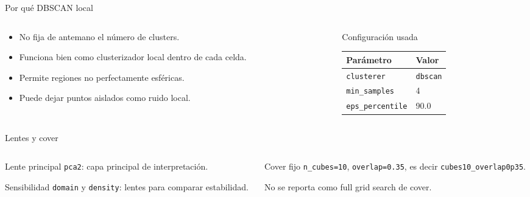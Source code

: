\documentclass[aspectratio=169,10pt]{beamer}
\begin{document}
\begin{frame}{Por qu\'e DBSCAN local}
  \begin{columns}[T,onlytextwidth]
    \begin{column}{0.50\textwidth}
      \begin{itemize}
        \item No fija de antemano el n\'umero de clusters.
        \item Funciona bien como clusterizador local dentro de cada celda.
        \item Permite regiones no perfectamente esf\'ericas.
        \item Puede dejar puntos aislados como ruido local.
      \end{itemize}
    \end{column}
    \begin{column}{0.46\textwidth}
      \begin{block}{Configuraci\'on usada}
        \small
        \begin{tabular}{ll}
          \toprule
          Par\'ametro & Valor \\
          \midrule
          \texttt{clusterer} & \texttt{dbscan} \\
          \texttt{min\_samples} & 4 \\
          \texttt{eps\_percentile} & 90.0 \\
          \bottomrule
        \end{tabular}
      \end{block}
    \end{column}
  \end{columns}
\end{frame}

\begin{frame}{Lentes y cover}
  \begin{columns}[T,onlytextwidth]
    \begin{column}{0.48\textwidth}
      \begin{block}{Lente principal}
        \texttt{pca2}: capa principal de interpretaci\'on.
      \end{block}
      \begin{block}{Sensibilidad}
        \texttt{domain} y \texttt{density}: lentes para comparar estabilidad.
      \end{block}
    \end{column}
    \begin{column}{0.48\textwidth}
      \begin{alertblock}{Cover fijo}
        \texttt{n\_cubes=10}, \texttt{overlap=0.35}, es decir \texttt{cubes10\_overlap0p35}.
      \end{alertblock}
      \small No se reporta como full grid search de cover.
    \end{column}
  \end{columns}
\end{frame}
\end{document}
